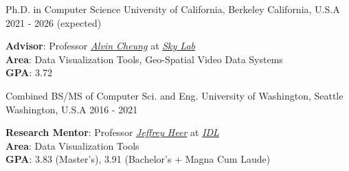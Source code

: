 
\begin{cventries}

\vspace{-4.0mm}
\begin{multicols}{2}

  \cventrycol
    {Ph.D. in Computer Science} %
    {University of California, Berkeley} %
    {California, U.S.A} %
    {2021 - 2026 (expected)} %
    {
      \vspace{-4.0mm}
      \begin{justify}
        \textbf{Advisor}: Professor \href{https://people.eecs.berkeley.edu/~akcheung/}{\textit{Alvin Cheung}} at \href{https://sky.cs.berkeley.edu/}{\textit{Sky Lab}}\\
        \textbf{Area}: Data Visualization Tools, Geo-Spatial Video Data Systems\\
        \textbf{GPA}: 3.72
      \end{justify}
    }
  \cventrycol
    {Combined BS/MS of Computer Sci. and Eng.} %
    {University of Washington, Seattle} %
    {Washington, U.S.A} %
    {2016 - 2021} %
    {
      \vspace{-4.0mm}
      \begin{justify}
        \textbf{Research Mentor}: Professor \href{https://homes.cs.washington.edu/~jheer/}{\textit{Jeffrey Heer}} at \href{https://idl.cs.washington.edu/}{\textit{IDL}}\\
        \textbf{Area}: Data Visualization Tools\\
        \textbf{GPA}: 3.83 (Master's), 3.91 (Bachelor's + Magna Cum Laude)
      \end{justify}
    }
\end{multicols}
\vspace{-8mm}
    

\end{cventries}
